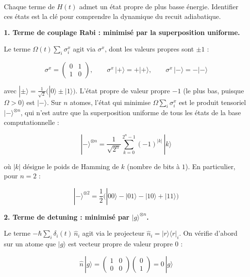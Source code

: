 \documentclass{ceri/sty/rapport}
\begin{document}
Chaque terme de $H(t)$ admet un état propre de plus basse énergie. Identifier ces états
est la clé pour comprendre la dynamique du recuit adiabatique.

\medskip
\noindent\textbf{1. Terme de couplage Rabi : minimisé par la superposition uniforme.}

Le terme $\Omega(t)\sum_i \sigma_i^x$ agit via $\sigma^x$, dont les valeurs propres sont $\pm 1$ :

\begin{equation}
\sigma^x = \begin{pmatrix} 0 & 1 \\ 1 & 0 \end{pmatrix},
\qquad
\sigma^x\,|{+}\rangle = +|{+}\rangle,
\qquad
\sigma^x\,|{-}\rangle = -|{-}\rangle
\end{equation}

avec $|{\pm}\rangle = \frac{1}{\sqrt{2}}\big(|0\rangle \pm |1\rangle\big)$.
L'état propre de valeur propre $-1$ (le plus bas, puisque $\Omega > 0$) est $|{-}\rangle$.
Sur $n$ atomes, l'état qui minimise $\Omega\sum_i\sigma_i^x$ est le produit tensoriel
$|{-}\rangle^{\otimes n}$, qui n'est autre que la superposition uniforme de tous les états
de la base computationnelle :

\begin{equation}
|{-}\rangle^{\otimes n}
= \frac{1}{\sqrt{2^n}}\sum_{k=0}^{2^n-1}(-1)^{|k|}\,|k\rangle
\end{equation}

où $|k|$ désigne le poids de Hamming de $k$ (nombre de bits à $1$). En particulier, pour $n=2$ :

\begin{equation}
|{-}\rangle^{\otimes 2}
= \frac{1}{2}\big(|00\rangle - |01\rangle - |10\rangle + |11\rangle\big)
\end{equation}

\medskip
\noindent\textbf{2. Terme de detuning : minimisé par $|g\rangle^{\otimes n}$.}

Le terme $-\hbar\sum_i\delta_i(t)\,\hat{n}_i$ agit via le projecteur $\hat{n}_i = |r\rangle\langle r|_i$.
On vérifie d'abord sur un atome que $|g\rangle$ est vecteur propre de valeur propre $0$ :

\begin{equation}
\hat{n}\,|g\rangle
= \begin{pmatrix} 1 & 0 \\ 0 & 0 \end{pmatrix}
\begin{pmatrix} 0 \\ 1 \end{pmatrix}
= 0\,|g\rangle
\end{equation}
\end{document}
